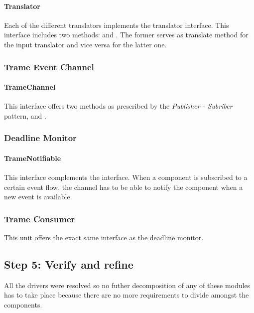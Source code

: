 \paragraph{Translator}

\npar Each of the different translators implements the 
translator interface. This interface includes two methods:
 and
. The former serves as translate method
for the input translator and vice versa for the latter one.

\subsubsection{Trame Event Channel}

\paragraph{TrameChannel}

\npar This interface offers two methods as prescribed by the \emph{Publisher -
Subriber} pattern,  and .

\subsubsection{Deadline Monitor}

\paragraph{TrameNotifiable}

\npar This interface complements the  interface. When a
component is subscribed to a certain event flow, the channel has to be able to
notify the component when a new event is available.

\subsubsection{Trame Consumer}

\npar This unit offers the exact same interface as the deadline monitor.


\subsection{Step 5: Verify and refine}
\label{add:it2/verification}

\npar All the drivers were resolved so no futher decomposition of any of these
modules has to take place because there are no more requirements to divide
amongst the components. 
